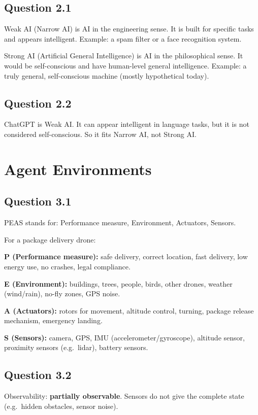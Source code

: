 \documentclass[paper=a4, fontsize=11pt]{scrartcl}
\begin{document}
\subsection*{Question 2.1}
Weak AI (Narrow AI) is AI in the engineering sense.
It is built for specific tasks and appears intelligent.
Example: a spam filter or a face recognition system.

Strong AI (Artificial General Intelligence) is AI in the philosophical sense.
It would be self-conscious and have human-level general intelligence.
Example: a truly general, self-conscious machine (mostly hypothetical today).

\subsection*{Question 2.2}
ChatGPT is Weak AI.
It can appear intelligent in language tasks, but it is not considered self-conscious.
So it fits Narrow AI, not Strong AI.

\section{Agent Environments}

\subsection*{Question 3.1}
PEAS stands for: Performance measure, Environment, Actuators, Sensors.

For a package delivery drone:

\textbf{P (Performance measure):}
safe delivery, correct location, fast delivery, low energy use, no crashes, legal compliance.

\textbf{E (Environment):}
buildings, trees, people, birds, other drones, weather (wind/rain), no-fly zones, GPS noise.

\textbf{A (Actuators):}
rotors for movement, altitude control, turning, package release mechanism, emergency landing.

\textbf{S (Sensors):}
camera, GPS, IMU (accelerometer/gyroscope), altitude sensor, proximity sensors (e.g.\ lidar),
battery sensors.

\subsection*{Question 3.2}
Observability: \textbf{partially observable}.
Sensors do not give the complete state (e.g.\ hidden obstacles, sensor noise).
\end{document}
